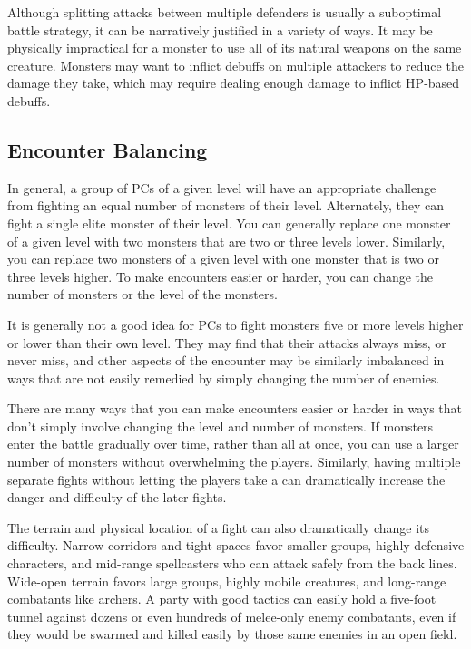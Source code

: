         Although splitting attacks between multiple defenders is usually a suboptimal battle strategy, it can be narratively justified in a variety of ways.
        It may be physically impractical for a monster to use all of its natural weapons on the same creature.
        Monsters may want to inflict debuffs on multiple attackers to reduce the damage they take, which may require dealing enough damage to inflict HP-based debuffs.

    \subsection{Encounter Balancing}\label{Encounter Balancing}
        In general, a group of PCs of a given level will have an appropriate challenge from fighting an equal number of monsters of their level.
        Alternately, they can fight a single elite monster of their level.
        You can generally replace one monster of a given level with two monsters that are two or three levels lower.
        Similarly, you can replace two monsters of a given level with one monster that is two or three levels higher.
        To make encounters easier or harder, you can change the number of monsters or the level of the monsters.

        It is generally not a good idea for PCs to fight monsters five or more levels higher or lower than their own level.
        They may find that their attacks always miss, or never miss, and other aspects of the encounter may be similarly imbalanced in ways that are not easily remedied by simply changing the number of enemies.

        There are many ways that you can make encounters easier or harder in ways that don't simply involve changing the level and number of monsters.
        If monsters enter the battle gradually over time, rather than all at once, you can use a larger number of monsters without overwhelming the players.
        Similarly, having multiple separate fights without letting the players take a  can dramatically increase the danger and difficulty of the later fights.

        The terrain and physical location of a fight can also dramatically change its difficulty.
        Narrow corridors and tight spaces favor smaller groups, highly defensive characters, and mid-range spellcasters who can attack safely from the back lines.
        Wide-open terrain favors large groups, highly mobile creatures, and long-range combatants like archers.
        A party with good tactics can easily hold a five-foot tunnel against dozens or even hundreds of melee-only enemy combatants, even if they would be swarmed and killed easily by those same enemies in an open field.

